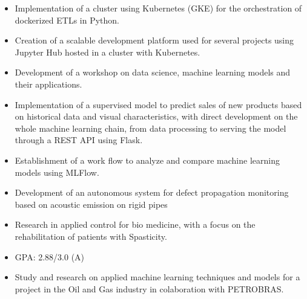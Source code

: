 \documentclass[10pt,a4paper,ragged2e,withhyper]{altacv}
\begin{document}
\begin{paracol}{2}
            \begin{itemize}
                \item Implementation of a cluster using Kubernetes (GKE) for the orchestration of dockerized ETLs in Python.
                \item Creation of a scalable development platform used for several projects using Jupyter Hub hosted in a cluster with Kubernetes.
                \item Development of a workshop on data science, machine learning models and their applications.
                \item Implementation of a supervised model to predict sales of new products based on historical data and visual
                characteristics, with direct development on the whole machine learning chain, from data processing to serving
                the model through a REST API using Flask.
                \item Establishment of a work flow to analyze and compare machine learning models using MLFlow.
            \end{itemize}
            \divider
            \newpage
            \begin{itemize}
                \item Development of an autonomous system for defect propagation monitoring based on acoustic emission on rigid pipes
            \end{itemize}
            \divider
            
            \begin{itemize}
                \item Research in applied control for bio medicine, with a focus on the rehabilitation of patients with Spasticity.
            \end{itemize}
            \divider
        
            \begin{itemize}
                \item GPA: 2.88/3.0 (A)
                \item Study and research on applied machine learning techniques and models for a project in the Oil and Gas industry in colaboration with PETROBRAS.
            \end{itemize}
            \divider
            

\end{paracol}
\end{document}

